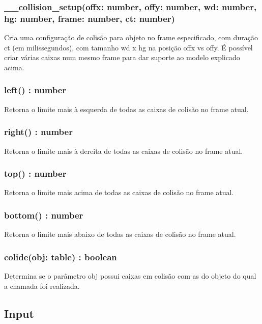\documentclass[
	12pt,				%
	openright,			%
	oneside,			%
	a4paper,			%
	brazil,				%
	]{abntex2}
\begin{document}
\subsubsection{\_\_collision\_setup(offx: number, offy: number, wd: number, hg: number, frame: number, ct: number)}

Cria uma configuração de colisão para objeto no frame especificado, com duração ct (em milissegundos), com tamanho wd x hg na posição offx vs offy. É possível criar várias caixas num mesmo frame para dar suporte ao modelo explicado acima.

\subsubsection{left() : number}

Retorna o limite mais à esquerda de todas as caixas de colisão no frame atual.

\subsubsection{right() : number}

Retorna o limite mais à dereita de todas as caixas de colisão no frame atual.

\subsubsection{top() : number}

Retorna o limite mais acima de todas as caixas de colisão no frame atual.

\subsubsection{bottom() : number}

Retorna o limite mais abaixo de todas as caixas de colisão no frame atual.

\subsubsection{colide(obj: table) : boolean}

Determina se o parâmetro obj possui caixas em colisão com as do objeto do qual a chamada foi realizada.

\subsection{Input}
\end{document}
